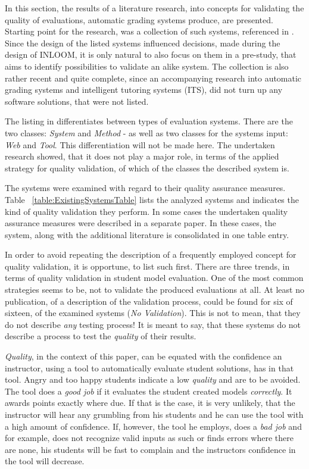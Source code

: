 In this section, the results of a literature research, into concepts for validating the quality
of evaluations, automatic grading systems produce, are presented. 
Starting point for the research, was a collection of such systems, referenced in \cite{1}.
Since the design of the listed systems influenced decisions, made during the design of INLOOM,
it is only natural to also focus on them in a pre-study, that aims to identify possibilities 
to validate an alike system. The collection is also rather recent and quite complete, since
an accompanying research into automatic grading systems and intelligent tutoring systems (ITS), 
did not turn up any software solutions, that were not listed.

The listing in \cite{1} differentiates between types of evaluation systems. There are the 
two classes: \textit{System} and \textit{Method} - as well as two classes for the systems 
input: \textit{Web} and \textit{Tool}. This differentiation will not be made here. The 
undertaken research showed, that it does not play a major role, in terms of the applied strategy
for quality validation, of which of the classes the described system is.

The systems were examined with regard to their quality assurance measures. 
Table ~\ref{table:ExistingSystemsTable} lists the analyzed systems and indicates the kind of 
quality validation they perform. In some cases the undertaken quality assurance measures were 
described in a separate paper. In these cases, the system, along with the additional literature 
is consolidated in one table entry.

In order to avoid repeating the description of a frequently employed concept for quality 
validation, it is opportune, to list such first. There are three trends, in terms of quality 
validation in student model evaluation. One of the most common strategies seems to be,  
not to validate the produced evaluations at all. At least no publication, of a description of 
the validation process, could be found for six of sixteen, of the examined systems 
\cite{9, 11, 12, 13, 14} (\textit{No Validation}). This is not to mean, that they do not 
describe \textit{any} testing process! It is meant to say, that these systems do not describe
a process to test the \textit{quality} of their results. 

\textit{Quality}, in the context of this paper, can be equated with the confidence an instructor, 
using a tool to automatically evaluate student solutions, has in that tool. Angry and too happy 
students indicate a low \textit{quality} and are to be avoided. The tool does a \textit{good job} 
if it evaluates the student created models \textit{correctly}. It awards points exactly where 
due. If that is the case, it is very unlikely, that the instructor will hear any grumbling from 
his students and he can use the tool with a high amount of confidence. If, however, the tool he
employs, does a \textit{bad job} and for example, does not recognize valid inputs as such or 
finds errors where there are none, his students will be fast to complain and the instructors 
confidence in the tool will decrease. 

